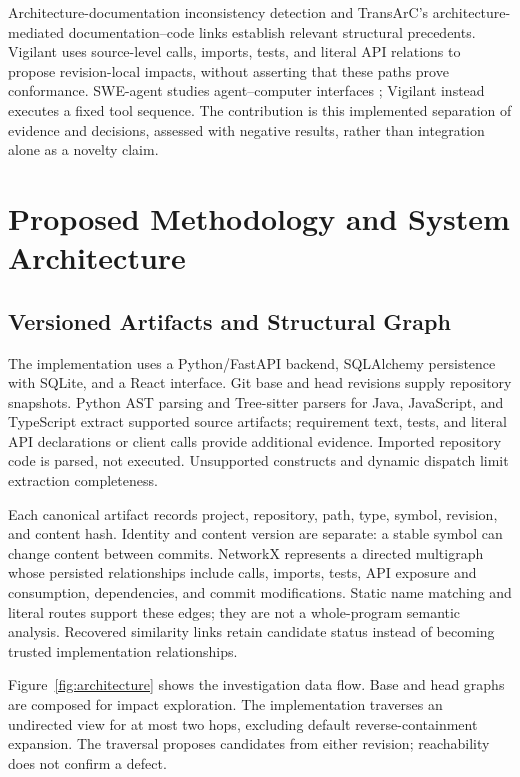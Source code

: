 \documentclass[conference,letterpaper,10pt]{IEEEtran}
\begin{document}
Architecture-documentation inconsistency detection \cite{archcons} and TransArC's architecture-mediated documentation--code links \cite{transarc} establish relevant structural precedents. Vigilant uses source-level calls, imports, tests, and literal API relations to propose revision-local impacts, without asserting that these paths prove conformance. SWE-agent studies agent--computer interfaces \cite{sweagent}; Vigilant instead executes a fixed tool sequence. The contribution is this implemented separation of evidence and decisions, assessed with negative results, rather than integration alone as a novelty claim.

\section{Proposed Methodology and System Architecture}
\subsection{Versioned Artifacts and Structural Graph}
The implementation uses a Python/FastAPI backend, SQLAlchemy persistence with SQLite, and a React interface. Git base and head revisions supply repository snapshots. Python AST parsing and Tree-sitter parsers for Java, JavaScript, and TypeScript extract supported source artifacts; requirement text, tests, and literal API declarations or client calls provide additional evidence. Imported repository code is parsed, not executed. Unsupported constructs and dynamic dispatch limit extraction completeness.

Each canonical artifact records project, repository, path, type, symbol, revision, and content hash. Identity and content version are separate: a stable symbol can change content between commits. NetworkX represents a directed multigraph whose persisted relationships include calls, imports, tests, API exposure and consumption, dependencies, and commit modifications. Static name matching and literal routes support these edges; they are not a whole-program semantic analysis. Recovered similarity links retain candidate status instead of becoming trusted implementation relationships.

Figure~\ref{fig:architecture} shows the investigation data flow. Base and head graphs are composed for impact exploration. The implementation traverses an undirected view for at most two hops, excluding default reverse-containment expansion. The traversal proposes candidates from either revision; reachability does not confirm a defect.
\end{document}
